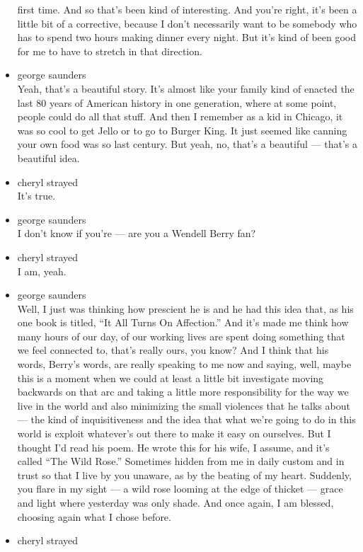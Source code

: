 \begin{itemize}
  first time. And so that's been kind of interesting. And you're right,
  it's been a little bit of a corrective, because I don't necessarily
  want to be somebody who has to spend two hours making dinner every
  night. But it's kind of been good for me to have to stretch in that
  direction.
\item
  george saunders\\
  Yeah, that's a beautiful story. It's almost like your family kind of
  enacted the last 80 years of American history in one generation, where
  at some point, people could do all that stuff. And then I remember as
  a kid in Chicago, it was so cool to get Jello or to go to Burger King.
  It just seemed like canning your own food was so last century. But
  yeah, no, that's a beautiful --- that's a beautiful idea.
\item
  cheryl strayed\\
  It's true.
\item
  george saunders\\
  I don't know if you're --- are you a Wendell Berry fan?
\item
  cheryl strayed\\
  I am, yeah.
\item
  george saunders\\
  Well, I just was thinking how prescient he is and he had this idea
  that, as his one book is titled, ``It All Turns On Affection.'' And
  it's made me think how many hours of our day, of our working lives are
  spent doing something that we feel connected to, that's really ours,
  you know? And I think that his words, Berry's words, are really
  speaking to me now and saying, well, maybe this is a moment when we
  could at least a little bit investigate moving backwards on that arc
  and taking a little more responsibility for the way we live in the
  world and also minimizing the small violences that he talks about ---
  the kind of inquisitiveness and the idea that what we're going to do
  in this world is exploit whatever's out there to make it easy on
  ourselves. But I thought I'd read his poem. He wrote this for his
  wife, I assume, and it's called ``The Wild Rose.'' Sometimes hidden
  from me in daily custom and in trust so that I live by you unaware, as
  by the beating of my heart. Suddenly, you flare in my sight --- a wild
  rose looming at the edge of thicket --- grace and light where
  yesterday was only shade. And once again, I am blessed, choosing again
  what I chose before.
\item
  cheryl strayed\\

\end{itemize}

